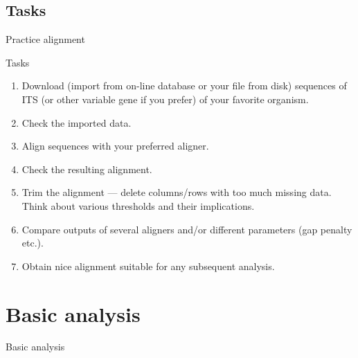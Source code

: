 \documentclass[compress, xelatex, 11pt, xcolor=svgnames, aspectratio=169,
	hyperref={
		bookmarks=true,
		unicode=true,
		colorlinks=true,
		pdftitle={Molecular data in R},
		plainpages=false,
		pdfauthor={Vojtech Zeisek},
		pdfsubject={Course about phylogeny and evolution in R},
		pdfcreator={XeLaTeX},
		pdfkeywords={R, evolution, phylogeny, molecular data},
		linkcolor=Crimson, %
		anchorcolor=Magenta, %
		citecolor=Magenta, %
		filecolor=Magenta, %
		menucolor=Magenta, %
		urlcolor=DodgerBlue, %
		},
	url={hyphens, lowtilde} %
	]{beamer}
\begin{document}
\subsection{Tasks}

\begin{frame}[fragile]{Practice alignment}
	\begin{exampleblock}{Tasks}
		\begin{enumerate}
			\item Download (import from on-line database or your file from disk) sequences of ITS (or other variable gene if you prefer) of your favorite organism.
			\item Check the imported data.
			\item Align sequences with your preferred aligner.
			\item Check the resulting alignment.
			\item Trim the alignment --- delete columns/rows with too much missing data. Think about various thresholds and their implications.
			\item Compare outputs of several aligners and/or different parameters (gap penalty etc.).
			\item Obtain nice alignment suitable for any subsequent analysis.
		\end{enumerate}
	\end{exampleblock}
\end{frame}

\section{Basic analysis}

\begin{frame}{Basic analysis}
	\tableofcontents[currentsection, sectionstyle=show/hide, hideothersubsections]
\end{frame}
\end{document}
